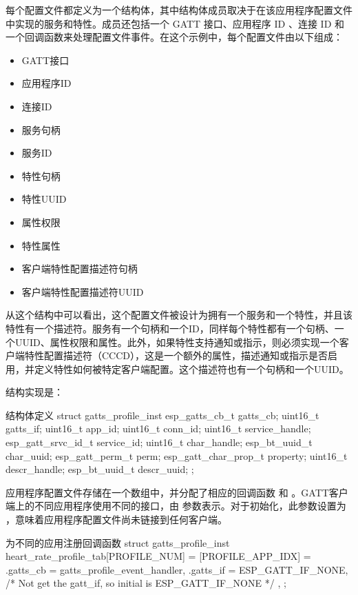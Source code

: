 \documentclass[lang=cn,newtx,10pt,scheme=chinese]{elegantbook}
\begin{document}
每个配置文件都定义为一个结构体，其中结构体成员取决于在该应用程序配置文件中实现的服务和特性。成员还包括一个 GATT 接口、应用程序 ID 、连接 ID 和一个回调函数来处理配置文件事件。在这个示例中，每个配置文件由以下组成：

\begin{itemize}
\item GATT接口
\item 应用程序ID
\item 连接ID
\item 服务句柄
\item 服务ID
\item 特性句柄
\item 特性UUID
\item 属性权限
\item 特性属性
\item 客户端特性配置描述符句柄
\item 客户端特性配置描述符UUID
\end{itemize}

从这个结构中可以看出，这个配置文件被设计为拥有一个服务和一个特性，并且该特性有一个描述符。服务有一个句柄和一个ID，同样每个特性都有一个句柄、一个UUID、属性权限和属性。此外，如果特性支持通知或指示，则必须实现一个客户端特性配置描述符（CCCD），这是一个额外的属性，描述通知或指示是否启用，并定义特性如何被特定客户端配置。这个描述符也有一个句柄和一个UUID。

结构实现是：

\begin{mycode}{结构体定义}
struct gatts_profile_inst {
    esp_gatts_cb_t gatts_cb;
    uint16_t gatts_if;
    uint16_t app_id;
    uint16_t conn_id;
    uint16_t service_handle;
    esp_gatt_srvc_id_t service_id;
    uint16_t char_handle;
    esp_bt_uuid_t char_uuid;
    esp_gatt_perm_t perm;
    esp_gatt_char_prop_t property;
    uint16_t descr_handle;
    esp_bt_uuid_t descr_uuid;
};
\end{mycode}

应用程序配置文件存储在一个数组中，并分配了相应的回调函数  和 。GATT客户端上的不同应用程序使用不同的接口，由  参数表示。对于初始化，此参数设置为 ，意味着应用程序配置文件尚未链接到任何客户端。

\begin{mycode}{为不同的应用注册回调函数}
struct gatts_profile_inst heart_rate_profile_tab[PROFILE_NUM] = {
    [PROFILE_APP_IDX] = {
        .gatts_cb = gatts_profile_event_handler,
        .gatts_if = ESP_GATT_IF_NONE, /* Not get the gatt_if, so initial is ESP_GATT_IF_NONE */
    },
};
\end{mycode}
\end{document}
